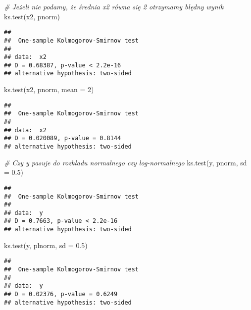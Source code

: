 \documentclass[
]{book}
\newenvironment{Shaded}{\begin{snugshade}}{\end{snugshade}}
\newcommand{\AttributeTok}[1]{\textcolor[rgb]{0.77,0.63,0.00}{#1}}
\newcommand{\CommentTok}[1]{\textcolor[rgb]{0.56,0.35,0.01}{\textit{#1}}}
\newcommand{\DecValTok}[1]{\textcolor[rgb]{0.00,0.00,0.81}{#1}}
\newcommand{\FloatTok}[1]{\textcolor[rgb]{0.00,0.00,0.81}{#1}}
\newcommand{\FunctionTok}[1]{\textcolor[rgb]{0.00,0.00,0.00}{#1}}
\newcommand{\NormalTok}[1]{#1}
\begin{document}
\begin{Shaded}
\begin{Highlighting}[]
\CommentTok{\# Jeżeli nie podamy, że średnia x2 równa się 2 otrzymamy błędny wynik}
\FunctionTok{ks.test}\NormalTok{(x2, pnorm)}
\end{Highlighting}
\end{Shaded}

\begin{verbatim}
## 
##  One-sample Kolmogorov-Smirnov test
## 
## data:  x2
## D = 0.68387, p-value < 2.2e-16
## alternative hypothesis: two-sided
\end{verbatim}

\begin{Shaded}
\begin{Highlighting}[]
\FunctionTok{ks.test}\NormalTok{(x2, pnorm, }\AttributeTok{mean =} \DecValTok{2}\NormalTok{)}
\end{Highlighting}
\end{Shaded}

\begin{verbatim}
## 
##  One-sample Kolmogorov-Smirnov test
## 
## data:  x2
## D = 0.020089, p-value = 0.8144
## alternative hypothesis: two-sided
\end{verbatim}

\begin{Shaded}
\begin{Highlighting}[]
\CommentTok{\# Czy y pasuje do rozkładu normalnego czy log{-}normalnego}
\FunctionTok{ks.test}\NormalTok{(y, pnorm, }\AttributeTok{sd =} \FloatTok{0.5}\NormalTok{)}
\end{Highlighting}
\end{Shaded}

\begin{verbatim}
## 
##  One-sample Kolmogorov-Smirnov test
## 
## data:  y
## D = 0.7663, p-value < 2.2e-16
## alternative hypothesis: two-sided
\end{verbatim}

\begin{Shaded}
\begin{Highlighting}[]
\FunctionTok{ks.test}\NormalTok{(y, plnorm, }\AttributeTok{sd =} \FloatTok{0.5}\NormalTok{)}
\end{Highlighting}
\end{Shaded}

\begin{verbatim}
## 
##  One-sample Kolmogorov-Smirnov test
## 
## data:  y
## D = 0.02376, p-value = 0.6249
## alternative hypothesis: two-sided
\end{verbatim}
\end{document}
